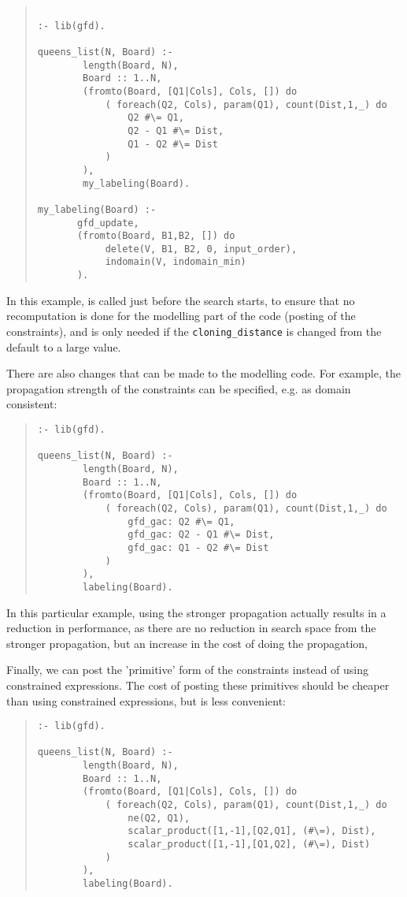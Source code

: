 \begin{quote}
\begin{verbatim}
    
:- lib(gfd).

queens_list(N, Board) :-
        length(Board, N),
        Board :: 1..N,
        (fromto(Board, [Q1|Cols], Cols, []) do
            ( foreach(Q2, Cols), param(Q1), count(Dist,1,_) do
                Q2 #\= Q1,
                Q2 - Q1 #\= Dist,
                Q1 - Q2 #\= Dist
            )
        ),
        my_labeling(Board).

my_labeling(Board) :-
       gfd_update,
       (fromto(Board, B1,B2, []) do
            delete(V, B1, B2, 0, input_order),
            indomain(V, indomain_min)
       ).

\end{verbatim}
\end{quote}
In this example,  is called just before the search starts,
to ensure that no recomputation is done for the modelling part of the code
(posting of the constraints), and is only needed if the \verb'cloning_distance' 
is changed from the default to a large value.

There are also changes that can be made to the modelling code. For example,
the propagation strength of the constraints can be specified, e.g. as domain
consistent:
\begin{quote}
\begin{verbatim}
:- lib(gfd).

queens_list(N, Board) :-
        length(Board, N),
        Board :: 1..N,
        (fromto(Board, [Q1|Cols], Cols, []) do
            ( foreach(Q2, Cols), param(Q1), count(Dist,1,_) do
                gfd_gac: Q2 #\= Q1,
                gfd_gac: Q2 - Q1 #\= Dist,
                gfd_gac: Q1 - Q2 #\= Dist
            )
        ),
        labeling(Board).  

\end{verbatim}
\end{quote}
In this particular example, using the stronger propagation actually results in
a reduction in performance, as there are no reduction in search space from the
stronger propagation, but an increase in the cost of doing the propagation, 

Finally, we can post the 'primitive' form of the constraints instead of using
constrained expressions. The cost of posting these primitives should be cheaper
than using constrained expressions, but is less convenient:
\begin{quote}
\begin{verbatim}
:- lib(gfd).

queens_list(N, Board) :-
        length(Board, N),
        Board :: 1..N,
        (fromto(Board, [Q1|Cols], Cols, []) do
            ( foreach(Q2, Cols), param(Q1), count(Dist,1,_) do
                ne(Q2, Q1),
                scalar_product([1,-1],[Q2,Q1], (#\=), Dist),
                scalar_product([1,-1],[Q1,Q2], (#\=), Dist)
            )
        ),
        labeling(Board).  

\end{verbatim}
\end{quote}

